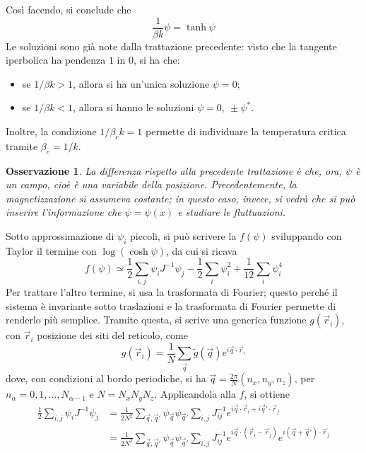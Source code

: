 \documentclass[11pt, a4paper]{scrartcl}
\theoremstyle{style}
\newtheorem{osservazione}{Osservazione}[section]
\theoremstyle{style1}
\numberwithin{equation}{subsection}
\begin{document}
Cos\`i facendo, si conclude che 
\begin{equation}
	\frac{1}{\beta k} \psi  = \tanh \psi 
\end{equation}
Le soluzioni sono gi\`a note dalla trattazione precedente: visto che la tangente iperbolica ha pendenza $1$ in $0$, si ha che:
\begin{itemize}
	\item  se $1/\beta k> 1$, allora si ha un'unica soluzione $\psi =0$;
	\item se $1 / \beta k < 1$, allora si hanno le soluzioni $\psi = 0, \ \pm\psi ^*$.
\end{itemize}
Inoltre, la condizione $1 / \beta _c k =1 $ permette di individuare la temperatura critica tramite $\beta _c = 1 / k$.
\begin{osservazione}
La differenza rispetto alla precedente trattazione \`e che, ora, $\psi $ \`e un campo, cio\`e \`e una variabile della posizione.
Precedentemente, la magnetizzazione si assumeva costante; in questo caso, invece, si vedr\`a che si pu\`o inserire l'informazione che $\psi =\psi (x)$ e studiare le fluttuazioni.
\end{osservazione}
\noindent Sotto approssimazione di $\psi_i $ piccoli, si pu\`o scrivere la $f(\psi )$ sviluppando con Taylor il termine con $\log\left(\cosh \psi\right) $, da cui si ricava
\[
	f(\psi) \simeq \frac{1}{2} \sum_{i,j}^{} \psi _i J^{-1}\psi _j - \frac{1}{2} \sum_{i}^{} \psi _i^2 + \frac{1}{12} \sum_{i}^{} \psi _i^4
\] 
Per trattare l'altro termine, si usa la trasformata di Fourier; questo perch\'e il sistema \`e invariante sotto traslazioni e la trasformata di Fourier permette di renderlo pi\`u semplice.
Tramite questa, si scrive una generica funzione $g(\vec{r}_i)$, con $\vec{r}_i$ posizione dei siti del reticolo, come
\[
	g(\vec{r}_i) = \frac{1}{N} \sum_{\vec{q}}^{} \tilde{g}(\vec{q}) e^{i \vec{q} \cdot \vec{r}_i}
\] 
dove, con condizioni al bordo periodiche, si ha $\vec{q}=\frac{2\pi}{N}(n_x,n_y,n_z)$, per $n_\alpha = 0,1,\ldots,N_{\alpha -1} $ e $N = N_x N_y N_z$.
Applicandola alla $f$, si ottiene
\[
	\begin{split}
		  \frac{1}{2} \sum_{i,j}^{} \psi _i J^{-1}\psi _j&= \frac{1}{2N^2} \sum_{\vec{q},\vec{q}'}^{} \psi _{\vec{q}} \psi _{\vec{q}'}  \sum_{i,j}^{} J^{-1}_{ij} e^{i \vec{q}\cdot \vec{r}_i + i \vec{q}' \cdot \vec{r}_j} \\
			 &= \frac{1}{2N^2} \sum_{\vec{q},\vec{q}'}^{} \psi _{\vec{q}} \psi _{\vec{q}'}  \sum_{i,j}^{} J^{-1 }_{ij} e^{i \vec{q}\cdot (\vec{r}_i -\vec{r}_j)} e^{i (\vec{q}+ \vec{q}')\cdot  \vec{r}_j}
	\end{split}
\] 
\end{document}
